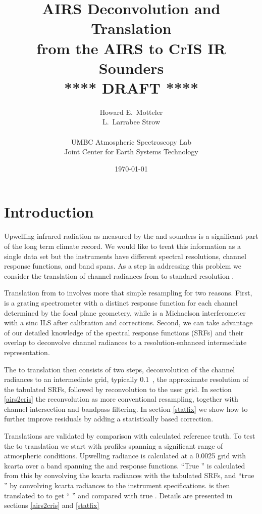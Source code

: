 \documentclass[12pt]{article}
\title{AIRS Deconvolution and Translation \\
  from the AIRS to CrIS IR Sounders \\
  \vspace{3mm}
  {****} DRAFT {****}\\
}
\author{Howard E.~Motteler \\
  L.~Larrabee Strow \\
  \\
  UMBC Atmospheric Spectroscopy Lab \\
  Joint Center for Earth Systems Technology \\
}
\date{\today}
\begin{document}
\maketitle

\section{Introduction}

Upwelling infrared radiation as measured by the {\airs} \cite{airs1}
and {\cris} \cite{cris1,cris2} sounders is a significant part of the
long term climate record.  We would like to treat this information as
a single data set but the instruments have different spectral
resolutions, channel response functions, and band spans.  As a step
in addressing this problem we consider the translation of channel
radiances from {\airs} to standard resolution {\cris}.

Translation from {\airs} to {\cris} involves more that simple
resampling for two reasons.  First, {\airs} is a grating spectrometer
with a distinct response function for each channel determined by the
focal plane geometery, while {\cris} is a Michaelson interferometer
with a sinc ILS after calibration and corrections.  Second, we can
take advantage of our detailed knowledge of the {\airs} spectral
response functions (SRFs) and their overlap to deconvolve channel
radiances to a resolution-enhanced intermediate representation.

The {\airs} to {\cris} translation then consists of two steps,
deconvolution of the {\airs} channel radiances to an intermediate
grid, typically $0.1$~\wn, the approximate resolution of the
tabulated {\airs} SRFs, followed by reconvolution to the {\cris} 
user grid.  In section \ref{airs2cris} the reconvolution as more
conventional resampling, together with channel intersection and
bandpass filtering.  In section \ref{statfix} we show how to further
improve residuals by adding a statistically based correction.

Translations are validated by comparison with calculated reference
truth.  To test the {\airs} to {\cris} translation we start with
profiles spanning a significant range of atmospheric conditions.
Upwelling radiance is calculated at a 0.0025 {\wn} grid with kcarta
\cite{kcarta1} over a band spanning the {\airs} and {\cris} response
functions.  ``True {\airs}'' is calculated from this by convolving
the kcarta radiances with the tabulated {\airs} SRFs, and ``true
{\cris}'' by convolving kcarta radiances to the {\cris} instrument
specifications.  {\airs} is then translated to {\cris} to get
``{\airs} {\cris}'' and compared with true {\cris}.  Details are
presented in sections \ref{airs2cris} and \ref{statfix}
\end{document}
